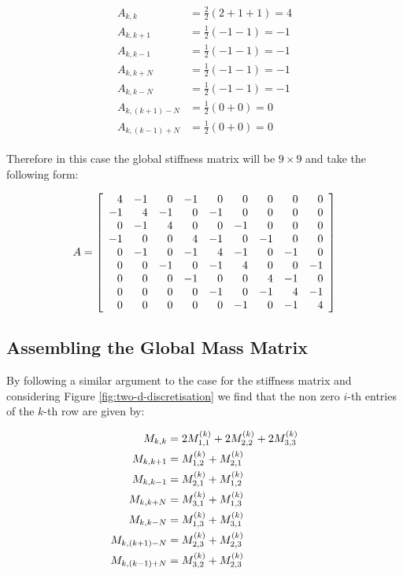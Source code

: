 \begin{align}
  \begin{split}
    A_{k,k} &= \frac{2}{2}(2 + 1 + 1) = 4 \\
    A_{k,k+1} &= \frac{1}{2}(-1 -1) = -1 \\
    A_{k,k-1} &= \frac{1}{2}(-1 -1) = -1  \\
    A_{k,k+N} &= \frac{1}{2}(-1 -1) = -1 \\
    A_{k,k-N} &= \frac{1}{2}(-1 -1) = -1 \\
    A_{k,(k+1)-N} &= \frac{1}{2}(0 + 0) = 0 \\
    A_{k,(k-1)+N} &= \frac{1}{2}(0 + 0) = 0
  \end{split}
\end{align}

Therefore in this case the global stiffness matrix will be
$9 \times 9$ and take the following form:

\begin{equation}
    A = \left[\begin{array}{r r r r r r r r r}
        4 & -1 &  0 & -1 &  0 &  0 &  0 &  0 &  0 \\
       -1 &  4 & -1 &  0 & -1 &  0 &  0 &  0 &  0 \\
        0 & -1 &  4 &  0 &  0 & -1 &  0 &  0 &  0 \\
       -1 &  0 &  0 &  4 & -1 &  0 & -1 &  0 &  0 \\
        0 & -1 &  0 & -1 &  4 & -1 &  0 & -1 &  0 \\
        0 &  0 & -1 &  0 & -1 &  4 &  0 &  0 & -1 \\
        0 &  0 &  0 & -1 &  0 &  0 &  4 & -1 &  0 \\
        0 &  0 &  0 &  0 & -1 &  0 & -1 &  4 & -1 \\
        0 &  0 &  0 &  0 &  0 & -1 &  0 & -1 & 4
    \end{array}\right]
\end{equation}

\subsection{Assembling the Global Mass Matrix}

By following a similar argument to the case for the stiffness matrix and
considering Figure \ref{fig:two-d-discretisation} we find that the non zero
$i$-th entries of the $k$-th row are given by:

\begin{align}
  \begin{split}
    M_{k,k} &= 2M^{(k)}_{1,1} + 2M^{(k)}_{2,2} + 2M^{(k)}_{3,3} \\
    M_{k,k+1} &= M^{(k)}_{1,2} + M^{(k)}_{2,1} \\
    M_{k,k-1} &= M^{(k)}_{2,1} + M^{(k)}_{1,2} \\
    M_{k,k+N} &= M^{(k)}_{3,1} + M^{(k)}_{1,3} \\
    M_{k,k-N} &= M^{(k)}_{1,3} + M^{(k)}_{3,1} \\
    M_{k,(k+1)-N} &= M^{(k)}_{2,3} + M^{(k)}_{2,3} \\
    M_{k,(k-1)+N} &= M^{(k)}_{3,2} + M^{(k)}_{2,3}
  \end{split}
\end{align}


